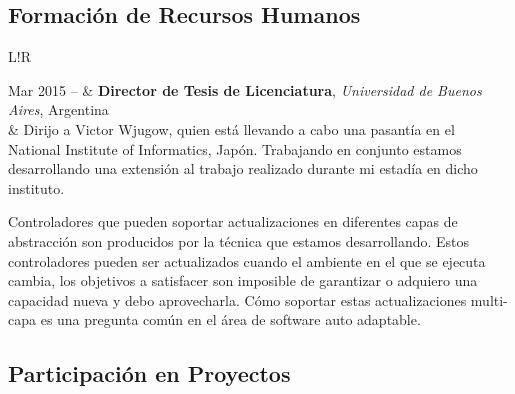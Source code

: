 \documentclass[10pt]{article}
\newcommand\VRule{\color{lightgray}\vrule width 0.5pt}
\begin{document}
\subsection*{Formación de Recursos Humanos}

\begin{tabular}{L!{\VRule}R}

Mar 2015 -- & \textbf{Director de Tesis de Licenciatura}, \textit{Universidad de Buenos Aires}, Argentina\\
& Dirijo a Victor Wjugow, quien está llevando a cabo una pasantía en el National Institute of Informatics, Japón. Trabajando
en conjunto estamos desarrollando una extensión al trabajo realizado durante mi estadía en dicho instituto.

Controladores que pueden soportar actualizaciones en diferentes capas de abstracción son producidos por la técnica que
estamos desarrollando. Estos controladores pueden ser actualizados cuando el ambiente en el que se ejecuta cambia,
los objetivos a satisfacer son imposible de garantizar o adquiero una capacidad nueva y debo aprovecharla. Cómo
soportar estas actualizaciones multi-capa es una pregunta común en el área de software auto adaptable.\\




\end{tabular}

\subsection*{Participación en Proyectos}
\end{document}
